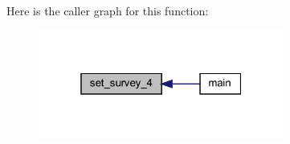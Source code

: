 Here is the caller graph for this function\+:\nopagebreak
\begin{figure}[H]
\begin{center}
\leavevmode
\includegraphics[width=229pt]{Leroi_8f90_ac15d94df59fcf9ff238738e88ec7ada0_icgraph}
\end{center}
\end{figure}
\mbox{\label{Leroi_8f90_a0fbc525b8664d780f1158e1061046731}} 
